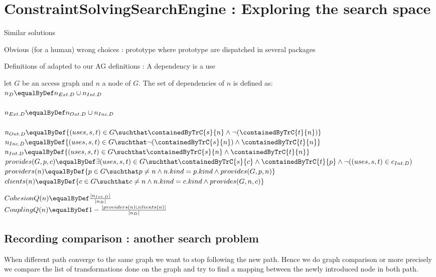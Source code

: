 \documentclass[]{article}
\begin{document}
\section{ConstraintSolvingSearchEngine : Exploring the search space}

Similar solutions

Obvious (for a human) wrong choices : prototype where prototype are dispatched in several packages 

Definitions of \cite{abdeen2009automatic} adapted to our AG definitions :
A dependency is a use

let $G$ be an access graph and $n$ a node of $G$.
The set of dependencies of $n$ is defined as:\\
$n_D \equalByDef n_{Ext.D}\cup n_{Int.D}$\\
\\
$n_{Ext.D} \equalByDef n_{Out.D}\cup n_{Inc.D}$\\
\\
$n_{Out.D} \equalByDef \{(uses, s, t)\in G \suchthat \containedByTrC{s}{n} \wedge \neg (\containedByTrC{t}{n}) \}$\\
$n_{Inc.D} \equalByDef \{(uses, s, t)\in G \suchthat \neg(\containedByTrC{s}{n}) \wedge \containedByTrC{t}{n} \}$\\
$n_{Int.D} \equalByDef \{(uses, s, t)\in G \suchthat \containedByTrC{s}{n} \wedge \containedByTrC{t}{n} \}$\\

\noindent$provides(G, p, c)\equalByDef \exists (uses, s, t) \in G \suchthat \containedByTrC{s}{c} \wedge \containedByTrC{t}{p} \wedge \neg((uses, s, t)\in c_{Int.D} )$\\
$providers(n) \equalByDef \{ p \in G  \suchthat p\neq n 
\wedge n.kind=p.kind 
\wedge provides(G, p, n) \}$\\
$clients(n) \equalByDef \{ c \in G  \suchthat c\neq n 
\wedge n.kind=c.kind 
\wedge provides(G, n, c) \}$

\noindent$CohesionQ(n) \equalByDef \frac{|n_{Int.D}|}{|n_D|}$\\
$CouplingQ(n) \equalByDef 1 - \frac{|providers(n) \cup clients(n)|}{|n_D|}$


\subsection{Recording comparison : another search problem}
When different path converge to the same graph we want to stop following the new path. Hence we do graph comparison or more precisely we compare the list of transformations done on the graph and try to find a mapping between the newly introduced node in both path.
\end{document}
